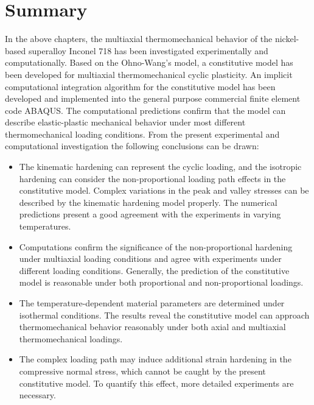 \section{Summary}
\noindent
In the above chapters, the multiaxial thermomechanical behavior of the nickel-based superalloy Inconel 718 has been investigated experimentally and computationally.
Based on the Ohno-Wang's model, a constitutive model has been developed for multiaxial thermomechanical cyclic plasticity.
An implicit computational integration algorithm for the constitutive model has been developed and implemented into the general purpose commercial finite element code ABAQUS. The computational predictions confirm that the model can describe elastic-plastic mechanical behavior under most different thermomechanical loading conditions.
From the present experimental and computational investigation the following conclusions can be drawn:
\begin{itemize}

\item {The kinematic hardening can represent the cyclic loading, and the isotropic hardening can consider the non-proportional loading path effects in the constitutive model.
Complex variations in the peak and valley stresses can be described by the kinematic hardening model properly. The numerical predictions present a good agreement with the experiments in varying temperatures.}

\item {Computations confirm the significance of the non-proportional hardening under multiaxial loading conditions and agree with experiments under different loading conditions. Generally, the prediction of the constitutive model is reasonable under both proportional and non-proportional loadings.}

\item {The temperature-dependent material parameters are determined under isothermal conditions. The results reveal the constitutive model can approach thermomechanical behavior reasonably under both axial and multiaxial thermomechanical loadings.}

\item{The complex loading path may induce additional strain hardening in the compressive normal stress, which cannot be caught by the present constitutive model. To quantify this effect, more detailed experiments are necessary.} 

\end{itemize}